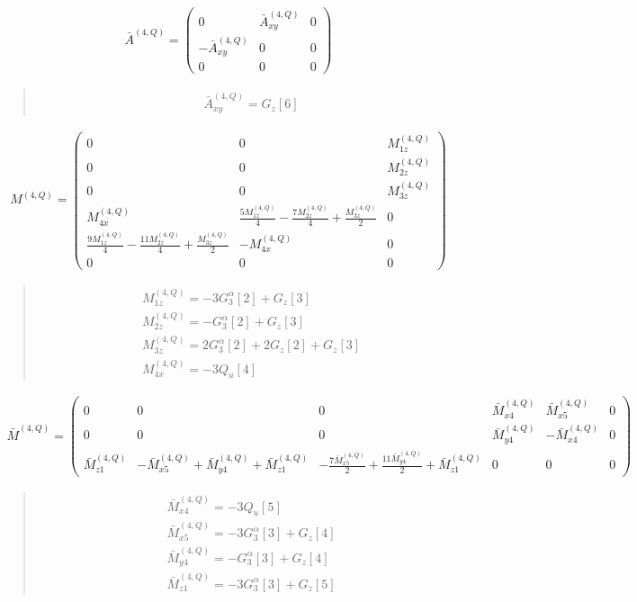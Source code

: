 \documentclass[fleqn,10pt]{jsarticle}
\begin{document}
\begin{align*}
\bar{A}^{(4,Q)} = \begin{pmatrix} 0 & \bar{A}^{(4,Q)}_{xy} & 0 \\ - \bar{A}^{(4,Q)}_{xy} & 0 & 0 \\ 0 & 0 & 0 \end{pmatrix}
\end{align*}
\begin{quote}
\begin{align*}
& \bar{A}^{(4,Q)}_{xy} = G_{z}[6]
\end{align*}
\end{quote}
\begin{align*}
M^{(4,Q)} = \begin{pmatrix} 0 & 0 & M^{(4,Q)}_{1z} \\ 0 & 0 & M^{(4,Q)}_{2z} \\ 0 & 0 & M^{(4,Q)}_{3z} \\ M^{(4,Q)}_{4x} & \frac{5 M^{(4,Q)}_{1z}}{4} - \frac{7 M^{(4,Q)}_{2z}}{4} + \frac{M^{(4,Q)}_{3z}}{2} & 0 \\ \frac{9 M^{(4,Q)}_{1z}}{4} - \frac{11 M^{(4,Q)}_{2z}}{4} + \frac{M^{(4,Q)}_{3z}}{2} & - M^{(4,Q)}_{4x} & 0 \\ 0 & 0 & 0 \end{pmatrix}
\end{align*}
\begin{quote}
\begin{align*}
& M^{(4,Q)}_{1z} = - 3 G_{3}^{\alpha}[2] + G_{z}[3] \\
& M^{(4,Q)}_{2z} = - G_{3}^{\alpha}[2] + G_{z}[3] \\
& M^{(4,Q)}_{3z} = 2 G_{3}^{\alpha}[2] + 2 G_{z}[2] + G_{z}[3] \\
& M^{(4,Q)}_{4x} = - 3 Q_{u}[4]
\end{align*}
\end{quote}
\begin{align*}
\bar{M}^{(4,Q)} = \begin{pmatrix} 0 & 0 & 0 & \bar{M}^{(4,Q)}_{x4} & \bar{M}^{(4,Q)}_{x5} & 0 \\ 0 & 0 & 0 & \bar{M}^{(4,Q)}_{y4} & - \bar{M}^{(4,Q)}_{x4} & 0 \\ \bar{M}^{(4,Q)}_{z1} & - \bar{M}^{(4,Q)}_{x5} + \bar{M}^{(4,Q)}_{y4} + \bar{M}^{(4,Q)}_{z1} & - \frac{7 \bar{M}^{(4,Q)}_{x5}}{2} + \frac{11 \bar{M}^{(4,Q)}_{y4}}{2} + \bar{M}^{(4,Q)}_{z1} & 0 & 0 & 0 \end{pmatrix}
\end{align*}
\begin{quote}
\begin{align*}
& \bar{M}^{(4,Q)}_{x4} = - 3 Q_{u}[5] \\
& \bar{M}^{(4,Q)}_{x5} = - 3 G_{3}^{\alpha}[3] + G_{z}[4] \\
& \bar{M}^{(4,Q)}_{y4} = - G_{3}^{\alpha}[3] + G_{z}[4] \\
& \bar{M}^{(4,Q)}_{z1} = - 3 G_{3}^{\alpha}[3] + G_{z}[5]
\end{align*}
\end{quote}
\end{document}
